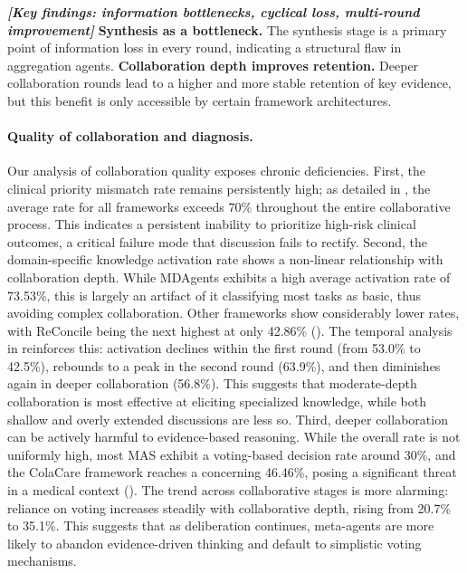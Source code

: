 \documentclass{article}
\begin{document}
\begin{custommdframed}
\textbf{\textit{[Key findings: information bottlenecks, cyclical loss, multi-round improvement]}}  \textbf{Synthesis as a bottleneck.} The synthesis stage is a primary point of information loss in every round, indicating a structural flaw in aggregation agents.  \textbf{Collaboration depth improves retention.} Deeper collaboration rounds lead to a higher and more stable retention of key evidence, but this benefit is only accessible by certain framework architectures.
\end{custommdframed}

\paragraph{Quality of collaboration and diagnosis.}

Our analysis of collaboration quality exposes chronic deficiencies. First, the clinical priority mismatch rate remains persistently high; as detailed in , the average rate for all frameworks exceeds 70\% throughout the entire collaborative process. This indicates a persistent inability to prioritize high-risk clinical outcomes, a critical failure mode that discussion fails to rectify. Second, the domain-specific knowledge activation rate shows a non-linear relationship with collaboration depth. While MDAgents exhibits a high average activation rate of 73.53\%, this is largely an artifact of it classifying most tasks as basic, thus avoiding complex collaboration. Other frameworks show considerably lower rates, with ReConcile being the next highest at only 42.86\% (). The temporal analysis in  reinforces this: activation declines within the first round (from 53.0\% to 42.5\%), rebounds to a peak in the second round (63.9\%), and then diminishes again in deeper collaboration (56.8\%). This suggests that moderate-depth collaboration is most effective at eliciting specialized knowledge, while both shallow and overly extended discussions are less so. Third, deeper collaboration can be actively harmful to evidence-based reasoning. While the overall rate is not uniformly high, most MAS exhibit a voting-based decision rate around 30\%, and the ColaCare framework reaches a concerning 46.46\%, posing a significant threat in a medical context (). The trend across collaborative stages is more alarming: reliance on voting increases steadily with collaborative depth, rising from 20.7\% to 35.1\%. This suggests that as deliberation continues, meta-agents are more likely to abandon evidence-driven thinking and default to simplistic voting mechanisms.
\end{document}
